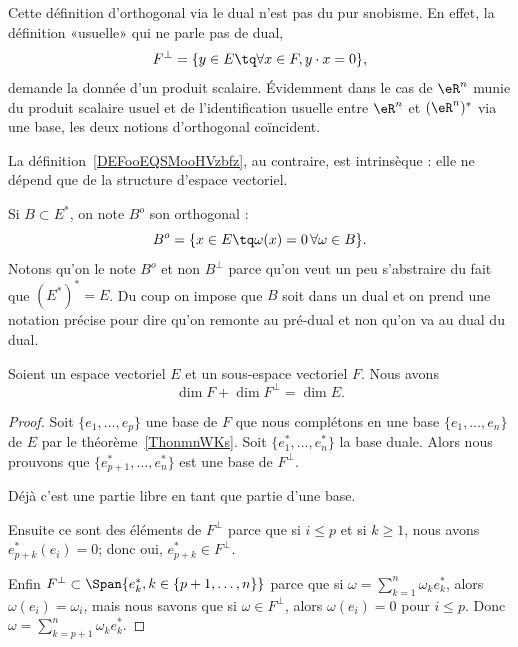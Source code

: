 Cette définition d'orthogonal via le dual n'est pas du pur snobisme. En effet, la définition «usuelle» qui ne parle pas de dual,
\begin{equation}
    F^{\perp}=\{ y\in E\tq \forall x\in F,y\cdot x=0 \},
\end{equation}
demande la donnée d'un produit scalaire. Évidemment dans le cas de \( \eR^n\) munie du produit scalaire usuel et de l'identification usuelle entre \( \eR^n\) et \( (\eR^n)^*\) via une base, les deux notions d'orthogonal coïncident.

La définition~\ref{DEFooEQSMooHVzbfz}, au contraire, est intrinsèque : elle ne dépend que de la structure d'espace vectoriel.

Si \( B\subset E^*\), on note \( B^o\) son orthogonal :
\begin{equation}
    B^o=\{ x\in E\tq \omega(x)=0\,\forall \omega\in B \}.
\end{equation}
Notons qu'on le note \( B^o\) et non \( B^{\perp}\) parce qu'on veut un peu s'abstraire du fait que \( (E^*)^*=E\). Du coup on impose que \( B\) soit dans un dual et on prend une notation précise pour dire qu'on remonte au pré-dual et non qu'on va au dual du dual.

\begin{proposition} \label{PropXrTDIi}
    Soient un espace vectoriel \( E\) et un sous-espace vectoriel \( F\). Nous avons
    \begin{equation}
        \dim F+\dim F^{\perp}=\dim E.
    \end{equation}
\end{proposition}

\begin{proof}
    Soit \( \{ e_1,\ldots, e_p \}\) une base de \( F\) que nous complétons en une base \( \{ e_1,\ldots, e_n \}\) de \( E\) par le théorème~\ref{ThonmnWKs}. Soit \( \{ e_1^*,\ldots, e^*_n \}\) la base duale. Alors nous prouvons que \( \{ e^*_{p+1},\ldots, e_n^* \}\) est une base de \( F^{\perp}\).

    Déjà c'est une partie libre en tant que partie d'une base.

    Ensuite ce sont des éléments de \( F^{\perp}\) parce que si \( i\leq p\) et si \( k\geq 1\), nous avons \( e^*_{p+k}(e_i)=0\); donc oui, \( e^*_{p+k}\in F^{\perp}\).

    Enfin \( F^{\perp}\subset\Span\{ e_{k}^*, k \in \{p+1, \dots, n\}\}\) parce que si \( \omega=\sum_{k=1}^n\omega_ke_k^*\), alors \( \omega(e_i)=\omega_i\), mais nous savons que si \( \omega\in F^{\perp}\), alors \( \omega(e_i)=0\) pour \( i\leq p\). Donc \( \omega=\sum_{k=p+1}^n\omega_ke^*_k\).
\end{proof}

